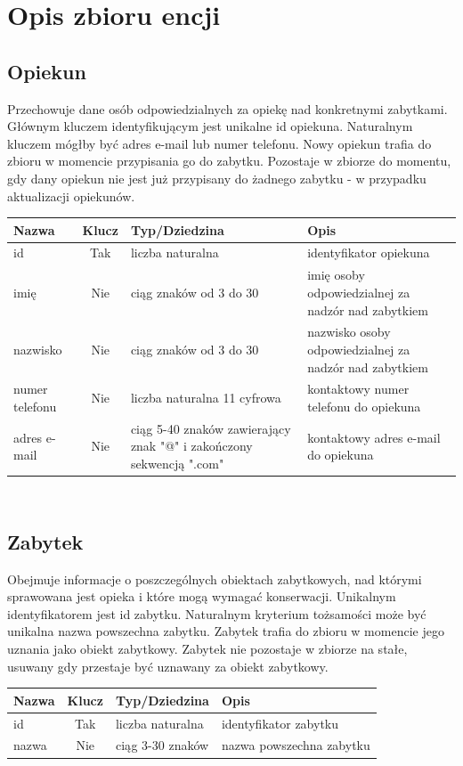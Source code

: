 \documentclass{article}
\begin{document}
\section{Opis zbioru encji}
\centering
\subsection*{Opiekun}
Przechowuje dane osób odpowiedzialnych za opiekę nad konkretnymi zabytkami. Głównym kluczem identyfikującym jest unikalne id opiekuna. Naturalnym kluczem mógłby być adres e-mail lub numer telefonu. Nowy opiekun trafia do zbioru w momencie przypisania go do zabytku. Pozostaje w zbiorze do momentu, gdy dany opiekun nie jest już przypisany do żadnego zabytku - w przypadku aktualizacji opiekunów.  
\begin{longtable}{|C{3cm}|c|C{4.5cm}|C{5cm}|}
\hline
\textbf{Nazwa} & \textbf{Klucz} & \textbf{Typ/Dziedzina} & \textbf{Opis} \\ \hline
id & Tak & liczba naturalna & identyfikator opiekuna \\ \hline 
imię & Nie & ciąg znaków od 3 do 30 & imię osoby odpowiedzialnej za nadzór nad zabytkiem \\ \hline 
nazwisko & Nie & ciąg znaków od 3 do 30 & nazwisko osoby odpowiedzialnej za nadzór nad zabytkiem \\ \hline 
numer telefonu & Nie & liczba naturalna 11 cyfrowa & kontaktowy numer telefonu do opiekuna \\ \hline
adres e-mail & Nie & ciąg 5-40 znaków zawierający znak "@" i zakończony sekwencją ".com" & kontaktowy adres e-mail do opiekuna \\ \hline
\end{longtable}

\subsection*{\\Zabytek}
Obejmuje informacje o poszczególnych obiektach zabytkowych, nad którymi sprawowana jest opieka i które mogą wymagać konserwacji. Unikalnym identyfikatorem jest id zabytku. Naturalnym kryterium tożsamości może być unikalna nazwa powszechna zabytku. Zabytek trafia do zbioru w momencie jego uznania jako obiekt zabytkowy. Zabytek nie pozostaje w zbiorze na stałe, usuwany gdy przestaje być uznawany za obiekt zabytkowy.  
\begin{longtable}{|C{3cm}|c|C{4.5cm}|C{5cm}|}
\hline
\textbf{Nazwa} & \textbf{Klucz} & \textbf{Typ/Dziedzina} & \textbf{Opis} \\ \hline
id & Tak & liczba naturalna & identyfikator zabytku \\ \hline
nazwa & Nie & ciąg 3-30 znaków & nazwa powszechna zabytku \\ \hline
\end{longtable}
\end{document}
